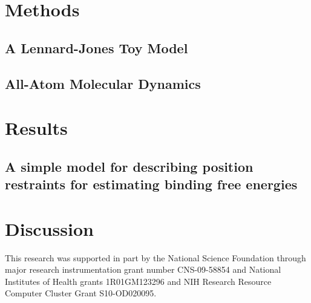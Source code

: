 \documentclass[%
 aip,
rsi,%
 amsmath,amssymb,
 reprint,%
]{revtex4-1}
\begin{document}

\section*{Methods}

\subsection{A Lennard-Jones Toy Model}

\subsection{All-Atom Molecular Dynamics}



\section*{Results}

\subsection*{A simple model for describing position restraints for estimating binding free energies}




\section*{Discussion}



\begin{acknowledgments}
This research was supported in part by the National Science Foundation through major research instrumentation grant number CNS-09-58854 and National Institutes of Health grants 1R01GM123296 and NIH Research Resource Computer Cluster Grant S10-OD020095.
\end{acknowledgments}

%
\end{document}
